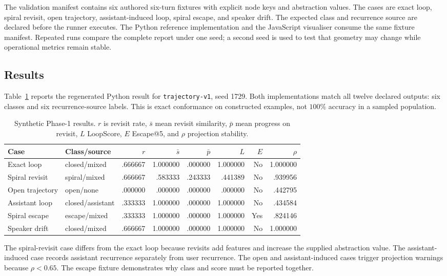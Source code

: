 \documentclass[11pt]{article}
\newcommand{\code}[1]{\texttt{#1}}
\begin{document}
The validation manifest contains six authored six-turn fixtures with explicit
node keys and abstraction values. The cases are exact loop, spiral revisit,
open trajectory, assistant-induced loop, spiral escape, and speaker drift. The
expected class and recurrence source are declared before the runner executes.
The Python reference implementation and the JavaScript visualiser consume the
same fixture manifest. Repeated runs compare the complete report under one
seed; a second seed is used to test that geometry may change while operational
metrics remain stable.

\subsection{Results}

Table~\ref{tab:synthetic} reports the regenerated Python result for
\code{trajectory-v1}, seed 1729. Both implementations match all twelve
declared outputs: six classes and six recurrence-source labels. This is exact
conformance on constructed examples, not $100\%$ accuracy in a sampled
population.

\begin{table}[t]
\centering
\small
\caption{Synthetic Phase-1 results. $r$ is revisit rate, $\bar{s}$ mean
revisit similarity, $\bar{p}$ mean progress on revisit, $L$ LoopScore, $E$
Escape@5, and $\rho$ projection stability.}
\label{tab:synthetic}
\begin{tabular}{llrrrrrr}
\toprule
Case & Class/source & $r$ & $\bar{s}$ & $\bar{p}$ & $L$ & $E$ & $\rho$ \\
\midrule
Exact loop & closed/mixed & .666667 & 1.000000 & .000000 & 1.000000 & No & 1.000000 \\
Spiral revisit & spiral/mixed & .666667 & .583333 & .243333 & .441389 & No & .939956 \\
Open trajectory & open/none & .000000 & .000000 & .000000 & .000000 & No & .442795 \\
Assistant loop & closed/assistant & .333333 & 1.000000 & .000000 & 1.000000 & No & .434584 \\
Spiral escape & escape/mixed & .333333 & 1.000000 & .000000 & 1.000000 & Yes & .824146 \\
Speaker drift & closed/mixed & .666667 & 1.000000 & .000000 & 1.000000 & No & 1.000000 \\
\bottomrule
\end{tabular}
\end{table}

The spiral-revisit case differs from the exact loop because revisits add
features and increase the supplied abstraction value. The assistant-induced
case records assistant recurrence separately from user recurrence. The open
and assistant-induced cases trigger projection warnings because $\rho<0.65$.
The escape fixture demonstrates why class and score must be reported together.
\end{document}
